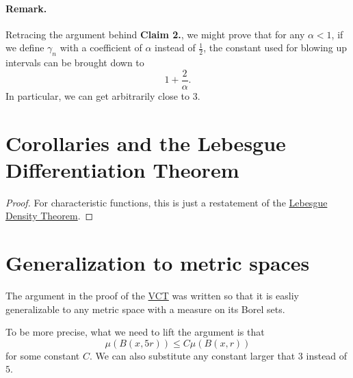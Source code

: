 \paragraph{Remark.} Retracing the argument behind \textbf{Claim 2.}, we might prove that for any \( \alpha < 1 \), if we define \( \gamma_n \) with a coefficient of \( \alpha \) instead of \( \frac{1}{2} \), the constant used for blowing up intervals can be brought down to
\[ 
    1 + \frac{2}{\alpha}. 
\]
In particular, we can get arbitrarily close to \( 3 \).

\section{Corollaries and the Lebesgue Differentiation Theorem}


\begin{proof}
    For characteristic functions, this is just a restatement of the \hyperlink{LebesgueDensityTheorem}{Lebesgue Density Theorem}.
\end{proof}

\section{Generalization to metric spaces}

The argument in the proof of the \hyperlink{VitaliCoveringTheorem}{VCT} was written so that it is easliy generalizable to any metric space with a measure on its Borel sets. 

To be more precise, what we need to lift the argument is that
\[ 
    \mu \left( B(x, 5r) \right) \leqslant C \mu \left( B(x,r) \right)
\]
for some constant \( C \). We can also substitute any constant larger that 3 instead of \( 5 \).
